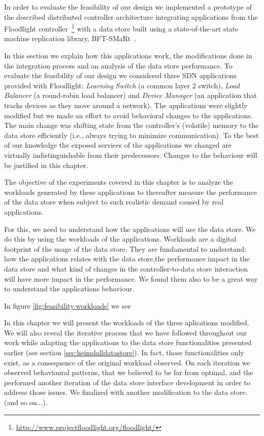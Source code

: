 \label{sec:feasibility:apps}
\glsresetall


In order to evaluate the feasibility of our design 
we implemented a prototype of the described distributed controller
architecture integrating applications from the Floodlight
controller~\footnote{\url{http://www.projectfloodlight.org/floodlight/}} with a
data store built using a state-of-the-art state machine replication
library, BFT-SMaRt~\cite{smart-tr,bft-smart:2011:High-perfomance}.

In this section we explain how this applications work, the
modifications done in the integration process and an analysis of the
data store performance. To evaluate the feasibility of our design we considered three SDN applications provided with Floodlight: \emph{Learning Switch}  (a common layer 2 switch), \emph{Load Balancer} (a round-robin load balancer) and \emph{Device Manager} (an application that tracks devices as they move around a network).
The applications were slightly modified but 
we made an effort to avoid behavioral changes to the applications.
The main change was shifting state from the controller's (volatile) memory to the data store efficiently (i.e., always trying to minimize communication).
To the best of our knowledge the exposed services of
the applications we changed are virtually indistinguishable from their
predecessors. Changes to the behaviour will be justified in this
chapter. 



The objective of the experiments covered in this chapter  is to analyze the workloads generated
by these applications to thereafter measure the performance of the
data store when subject to such realistic demand caused by real applications.

For this, we need to understand how the applications will use the data
store. We do this by using the workloads of the
applications. Workloads are a digital footprint of the usage of the
data store.  They are fundamental to understand: how the applications
relates with the data store,the performance impact in the data store
and what kind of changes in the controller-to-data store interaction will have more impact in
the performance. We found them also to be a great way to understand
the applications behaviour. 

In figure \ref{fig:feasibility:workloads} we see 

In this chapter we will present the workloads of the three aplications
modified. We will also reveal the iterative process that we have
followed throughout our work while adapting the applications to the
data store functionalities presented earlier (see section
\ref{sec:heimdalldatastore}). In fact, those functionalities only
exist, as a consequence of the original workload observed. On each
iteration we observed behavioural patterns, that we believed to be far
from optimal, and the performed another iteration of the data store
interface development in order to address those issues. We finalized
with another modification to the data store. (and so on...). 

